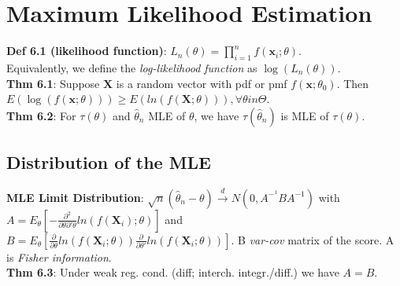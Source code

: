 \section{Maximum Likelihood Estimation}
\textbf{Def 6.1 (likelihood function)}: $L_n(\theta) = \prod_{i=1}^nf(\textbf{x}_i;\theta)$.\\
Equivalently, we define the \textit{log-likelihood function} as $\log(L_n(\theta))$.\\
\textbf{Thm 6.1}: Suppose $\textbf{X}$ is a random vector with pdf or pmf $f(\textbf{x};\theta_0)$. Then $E(\log(f(\textbf{x};\theta)))\geq E(ln(f(\textbf{X};\theta))), \forall \theta in \Theta$.\\
\textbf{Thm 6.2}: For $\tau(\theta)$ and $\hat{\theta}_n$ MLE of $\theta$, we have $\tau(\hat{\theta}_n)$ is MLE of $\tau(\theta)$.

\subsection{Distribution of the MLE}
\textbf{MLE Limit Distribution}: $\sqrt{n}(\hat{\theta}_n - \theta) \xrightarrow{d} N(0, A^{-^1}BA^{-1})$ with $A = E_\theta[-\frac{\partial^2}{\partial\theta\partial'\theta}ln(f(\textbf{X}_i);\theta)]$ and $B = E_\theta[\frac{\partial}{\partial\theta}ln(f(\textbf{X}_i;\theta))\frac{\partial}{\partial\theta'}ln(f(\textbf{X}_i;\theta))]$. B \textit{var-cov} matrix of the score. A is \textit{Fisher information}.\\
\textbf{Thm 6.3}: Under weak reg. cond. (diff; interch. integr./diff.) we have $A=B$.

